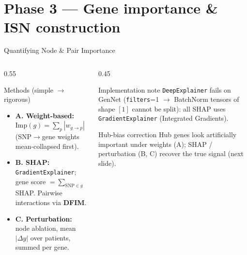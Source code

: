 \documentclass[aspectratio=169]{beamer}
\begin{document}
\section{Phase 3 — Gene importance \& ISN construction}

\begin{frame}{Quantifying Node \& Pair Importance}
    \small
    \begin{columns}[T]
        \begin{column}{0.55\textwidth}
            \begin{block}{Methods (simple $\rightarrow$ rigorous)}
                \footnotesize
                \begin{itemize}
                    \item \textbf{A. Weight-based:} $\text{Imp}(g)=\sum_p|w_{g\to p}|$
                          (SNP$\to$gene weights mean-collapsed first).
                    \item \textbf{B. SHAP:} \texttt{GradientExplainer}; gene score $=\sum_{\text{SNP}\in g}$ SHAP.
                          Pairwise interactions via \textbf{DFIM}.
                    \item \textbf{C. Perturbation:} node ablation, mean$|\Delta y|$ over patients, summed per gene.
                \end{itemize}
            \end{block}
        \end{column}
        \begin{column}{0.45\textwidth}
            \begin{block}{Implementation note}
                \footnotesize
                \texttt{DeepExplainer} fails on GenNet (\texttt{filters}=1 $\rightarrow$ BatchNorm tensors of
                shape $[1]$ cannot be split): all SHAP uses \texttt{GradientExplainer} (Integrated Gradients).
            \end{block}
            \begin{block}{Hub-bias correction}
                \footnotesize
                Hub genes look artificially important under weights (A); SHAP / perturbation (B, C) recover the
                true signal (next slide).
            \end{block}
        \end{column}
    \end{columns}
\end{frame}
\end{document}

